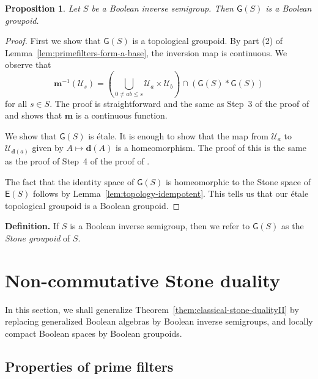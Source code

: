 \documentclass[a4paper]{amsart}
\newtheorem{proposition}[theorem]{Proposition}
\begin{document}
\begin{proposition}\label{prop:from-bis-to-boolean-groupoid} Let $S$ be a Boolean inverse semigroup.
Then $\mathsf{G}(S)$ is a Boolean groupoid.
\end{proposition} 
\begin{proof} First we show that $\mathsf{G}(S)$ is a topological groupoid.
By part (2) of Lemma~\ref{lem:primefilters-form-a-base}, the inversion map is continuous.
We observe that
$$\mathbf{m}^{-1}(\mathscr{U}_{s}) = \left( \bigcup_{0 \neq ab \leq s} \mathscr{U}_{a} \times \mathscr{U}_{b} \right) \cap (\mathsf{G} (S) \ast \mathsf{G} (S))$$
for all $s \in S$.
The proof is straightforward and the same as Step~3 of the proof of \cite[Proposition~2.22]{Lawson3}
and shows that $\mathbf{m}$ is a continuous function.

We show that $\mathsf{G}(S)$ is \'etale.
It is enough to show that the map from $\mathscr{U}_{a}$ to $\mathscr{U}_{\mathbf{d}(a)}$
given by $A \mapsto \mathbf{d}(A)$ is a homeomorphism.
The proof of this is the same as the proof of Step~4 of the proof of \cite[Proposition~2.22]{Lawson3}.

The fact that the identity space of $\mathsf{G}(S)$ is homeomorphic to
the Stone space of $\mathsf{E}(S)$ follows by Lemma~\ref{lem:topology-idempotent}.
This tells us that our \'etale topological groupoid is a Boolean groupoid.
\end{proof}


\noindent
{\bf Definition. }If $S$ is a Boolean inverse semigroup, then we refer to $\mathsf{G}(S)$ as the {\em Stone groupoid} of $S$.\\


\section{Non-commutative Stone duality}

In this section, we shall generalize Theorem~\ref{them:classical-stone-dualityII}
by replacing generalized Boolean algebras by Boolean inverse semigroups,
and locally compact Boolean spaces by Boolean groupoids.


\subsection{Properties of prime filters}
\end{document}
